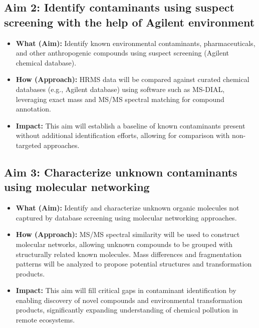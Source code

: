 \documentclass[11pt]{article}
\begin{document}
\begin{doublespace}
    \subsection{Aim 2: Identify contaminants using suspect screening with the help of Agilent environment}
        \begin{itemize}
            \item {\textbf{What (Aim):}} Identify known environmental contaminants, pharmaceuticals, and other anthropogenic compounds using suspect screening (Agilent chemical database).
            \item {\textbf{How (Approach):}} HRMS data will be compared against curated chemical databases (e.g., Agilent database) using software such as MS-DIAL, leveraging exact mass and MS/MS spectral matching for compound annotation.
            \item {\textbf{Impact:}} This aim will establish a baseline of known contaminants present without additional identification efforts, allowing for comparison with non-targeted approaches. 
        \end{itemize}

    \subsection{Aim 3: Characterize unknown contaminants using molecular networking}
        \begin{itemize}
            \item {\textbf{What (Aim):}} Identify and characterize unknown organic molecules not captured by database screening using molecular networking approaches.
            \item {\textbf{How (Approach):}} MS/MS spectral similarity will be used to construct molecular networks, allowing unknown compounds to be grouped with structurally related known molecules. Mass differences and fragmentation patterns will be analyzed to propose potential structures and transformation products.
            \item {\textbf{Impact:}} This aim will fill critical gaps in contaminant identification by enabling discovery of novel compounds and environmental transformation products, significantly expanding understanding of chemical pollution in remote ecosystems.
        \end{itemize}


\end{doublespace}

\newpage

\end{document}

